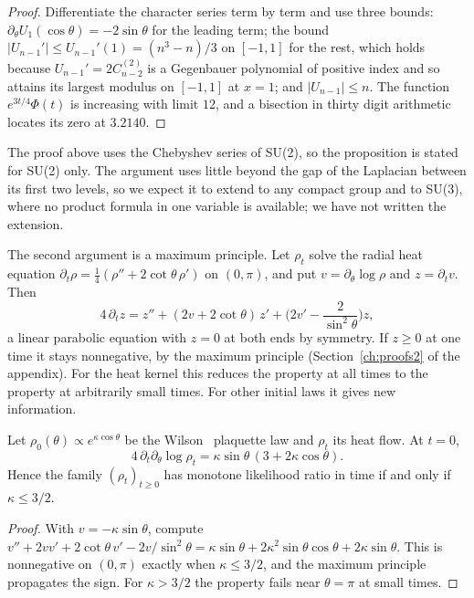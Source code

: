\begin{proof}
Differentiate the character series term by term and use three bounds: $\partial_\theta U_1(\cos\theta)=-2\sin\theta$ for the leading term; the bound $|U_{n-1}'|\le U_{n-1}'(1)=(n^3-n)/3$ on $[-1,1]$ for the rest, which holds because $U_{n-1}'=2C^{(2)}_{n-2}$ is a Gegenbauer polynomial of positive index and so attains its largest modulus on $[-1,1]$ at $x=1$; and $|U_{n-1}|\le n$. The function $e^{3t/4}\Phi(t)$ is increasing with limit $12$, and a bisection in thirty digit arithmetic locates its zero at $3.2140$.
\end{proof}

The proof above uses the Chebyshev series of SU(2), so the proposition is stated for SU(2) only. The argument uses little beyond the gap of the Laplacian between its first two levels, so we expect it to extend to any compact group and to SU(3), where no product formula in one variable is available; we have not written the extension.

The second argument is a maximum principle. Let $\rho_t$ solve the radial heat equation $\partial_t\rho=\frac14(\rho''+2\cot\theta\,\rho')$ on $(0,\pi)$, and put $v=\partial_\theta\log\rho$ and $z=\partial_tv$. Then
\[
4\,\partial_tz=z''+(2v+2\cot\theta)\,z'+\Big(2v'-\frac{2}{\sin^2\theta}\Big)z ,
\]
a linear parabolic equation with $z=0$ at both ends by symmetry. If $z\ge0$ at one time it stays nonnegative, by the maximum principle (Section~\ref{ch:proofs2} of the appendix). For the heat kernel this reduces the property at all times to the property at arbitrarily small times. For other initial laws it gives new information.

\begin{proposition}\label{prop:wilsonflow}
Let $\rho_0(\theta)\propto e^{\kappa\cos\theta}$ be the Wilson~\cite{Wi74} plaquette law and $\rho_t$ its heat flow. At $t=0$,
\[
4\,\partial_t\partial_\theta\log\rho_t=\kappa\sin\theta\,(3+2\kappa\cos\theta).
\]
Hence the family $(\rho_t)_{t\ge0}$ has monotone likelihood ratio in time if and only if $\kappa\le3/2$.
\end{proposition}

\begin{proof}
With $v=-\kappa\sin\theta$, compute $v''+2vv'+2\cot\theta\,v'-2v/\sin^2\theta=\kappa\sin\theta+2\kappa^2\sin\theta\cos\theta+2\kappa\sin\theta$. This is nonnegative on $(0,\pi)$ exactly when $\kappa\le3/2$, and the maximum principle propagates the sign. For $\kappa>3/2$ the property fails near $\theta=\pi$ at small times.
\end{proof}

